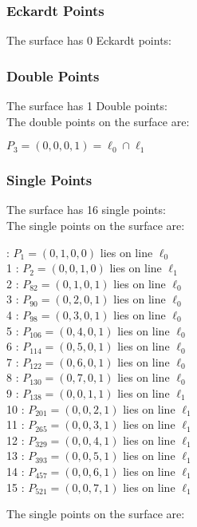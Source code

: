 \documentclass{article}
\begin{document}
{\subsubsection*{Eckardt Points}
The surface has 0 Eckardt points:\\
\subsubsection*{Double Points}
The surface has 1 Double points:\\
The double points on the surface are:\\
\begin{multicols}{2}
\noindent
$P_{3} = ( 0, 0, 0, 1 ) = \ell_{0} \cap \ell_{1} $\\
\end{multicols}
\subsubsection*{Single Points}
The surface has 16 single points:\\
The single points on the surface are:\\
\begin{multicols}{2}
 : $P_{1}=( 0, 1, 0, 0 )$ lies on line $\ell_{0}$\\
1 : $P_{2}=( 0, 0, 1, 0 )$ lies on line $\ell_{1}$\\
2 : $P_{82}=( 0, 1, 0, 1 )$ lies on line $\ell_{0}$\\
3 : $P_{90}=( 0, 2, 0, 1 )$ lies on line $\ell_{0}$\\
4 : $P_{98}=( 0, 3, 0, 1 )$ lies on line $\ell_{0}$\\
5 : $P_{106}=( 0, 4, 0, 1 )$ lies on line $\ell_{0}$\\
6 : $P_{114}=( 0, 5, 0, 1 )$ lies on line $\ell_{0}$\\
7 : $P_{122}=( 0, 6, 0, 1 )$ lies on line $\ell_{0}$\\
8 : $P_{130}=( 0, 7, 0, 1 )$ lies on line $\ell_{0}$\\
9 : $P_{138}=( 0, 0, 1, 1 )$ lies on line $\ell_{1}$\\
10 : $P_{201}=( 0, 0, 2, 1 )$ lies on line $\ell_{1}$\\
11 : $P_{265}=( 0, 0, 3, 1 )$ lies on line $\ell_{1}$\\
12 : $P_{329}=( 0, 0, 4, 1 )$ lies on line $\ell_{1}$\\
13 : $P_{393}=( 0, 0, 5, 1 )$ lies on line $\ell_{1}$\\
14 : $P_{457}=( 0, 0, 6, 1 )$ lies on line $\ell_{1}$\\
15 : $P_{521}=( 0, 0, 7, 1 )$ lies on line $\ell_{1}$\\
\end{multicols}
The single points on the surface are:\\
}
\end{document}
